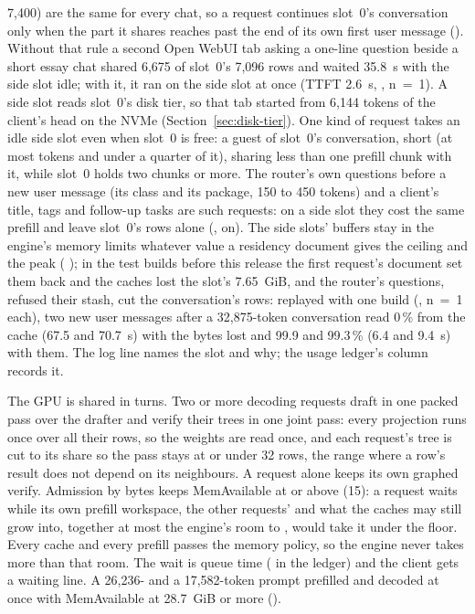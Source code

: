 7,400) are the same for every chat, so a request continues slot~0's conversation only when the part it shares reaches past the end of its own first user message (). Without that rule a second Open WebUI tab asking a one-line question beside a short essay chat shared 6,675 of slot~0's 7,096 rows and waited 35.8~s with the side slot idle; with it, it ran on the side slot at once (TTFT 2.6~s, \measured, n~=~1). A side slot reads slot~0's disk tier, so that tab started from 6,144 tokens of the client's head on the NVMe (Section~\ref{sec:disk-tier}). One kind of request takes an idle side slot even when slot~0 is free: a guest of slot~0's conversation, short (at most  tokens and under a quarter of it), sharing less than one prefill chunk with it, while slot~0 holds two chunks or more. The router's own questions before a new user message (its class and its package, 150 to 450 tokens) and a client's title, tags and follow-up tasks are such requests: on a side slot they cost the same prefill and leave slot~0's rows alone (, on). The side slots' buffers stay in the engine's memory limits whatever value a residency document gives the ceiling and the peak ( ); in the test builds before this release the first request's document set them back and the caches lost the slot's 7.65~GiB, and the router's questions, refused their stash, cut the conversation's rows: replayed with one build (\measured, n~=~1 each), two new user messages after a 32,875-token conversation read 0\,\% from the cache (67.5 and 70.7~s) with the bytes lost and 99.9 and 99.3\,\% (6.4 and 9.4~s) with them. The \code{[parallel]} log line names the slot and why; the usage ledger's  column records it.

The GPU is shared in turns. Two or more decoding requests draft in one packed pass over the drafter and verify their trees in one joint pass: every projection runs once over all their rows, so the weights are read once, and each request's tree is cut to its share so the pass stays at or under 32 rows, the range where a row's result does not depend on its neighbours. A request alone keeps its own graphed verify. Admission by bytes keeps MemAvailable at or above  (15): a request waits while its own prefill workspace, the other requests' and what the caches may still grow into, together at most the engine's room to , would take it under the floor. Every cache and every prefill passes the memory policy, so the engine never takes more than that room. The wait is queue time ( in the ledger) and the client gets a waiting line. A 26,236- and a 17,582-token prompt prefilled and decoded at once with MemAvailable at 28.7~GiB or more (\measured).


